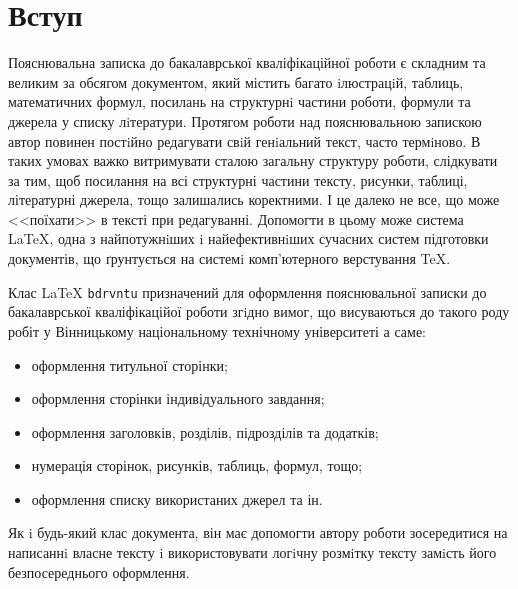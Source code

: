 \chapter*{Вступ}

Пояснювальна записка до бакалаврської кваліфікаційної роботи є складним та великим за обсягом документом, який містить
багато iлюстрацiй, таблиць, математичних формул, посилань на структурнi частини роботи, формули та джерела у списку 
лiтератури. Протягом роботи над пояснювальною запискою автор повинен постiйно редагувати свiй генiальний текст,
часто термiново. В таких умовах важко витримувати сталою загальну структуру роботи, слідкувати за тим, щоб посилання
на всі структурні частини тексту, рисунки, таблиці, літературні джерела, тощо залишались коректними. І це далеко не все,
що може <<поїхати>> в тексті при редагуванні. Допомогти в цьому може система \LaTeX, одна з найпотужнiших i найефективнiших 
сучасних систем підготовки документів, що ґрунтується на системi комп’ютерного верстування \TeX \cite{latexctan}.

Клас {\LaTeX} {\verb|bdrvntu|} призначений для оформлення пояснювальної записки до бакалаврської кваліфікаційої роботи згiдно вимог,
що висуваються до такого роду робіт у Вінницькому національному технічному університеті а саме:

\begin{itemize}
\item оформлення титульної сторінки;
\item оформлення сторінки індивідуального завдання;
\item оформлення заголовків, розділів, підрозділів та додатків;
\item нумерація сторінок, рисунків, таблиць, формул, тощо;
\item оформлення списку використаних джерел та ін.
\end{itemize} 

Як i будь-який клас документа, він має допомогти автору роботи зосередитися на написаннi власне тексту i використовувати 
логiчну розмiтку тексту замiсть його безпосереднього оформлення.